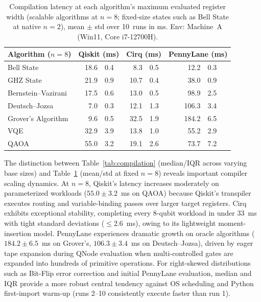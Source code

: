 \documentclass[runningheads]{llncs}
\begin{document}
\begin{table}[htbp]
\centering
\caption{Compilation latency at each algorithm's maximum evaluated register width (scalable algorithms at $n=8$; fixed-size states such as Bell State at native $n=2$), mean $\pm$ std over 10~runs in ms. Env: Machine~A (Win11, Core i7-12700H).}
\label{tab:compilation_8q}
\renewcommand{\arraystretch}{1.15}
\setlength{\tabcolsep}{6pt}
\begin{tabular}{@{}l r@{$\,\pm\,$}l r@{$\,\pm\,$}l r@{$\,\pm\,$}l@{}}
\toprule
\textbf{Algorithm ($n=8$)} & \multicolumn{2}{c}{\textbf{Qiskit (ms)}} & \multicolumn{2}{c}{\textbf{Cirq (ms)}} & \multicolumn{2}{c}{\textbf{PennyLane (ms)}} \\
\midrule
Bell State           & 18.6 & 0.4 &  8.3 & 0.5 &  12.2 & 0.3 \\
GHZ State            & 21.9 & 0.9 & 10.7 & 0.4 &  38.0 & 0.9 \\
Bernstein--Vazirani  & 17.5 & 0.6 & 13.0 & 0.5 &  98.9 & 2.5 \\
Deutsch--Jozsa       &  7.0 & 0.3 & 12.1 & 1.3 & 106.3 & 3.4 \\
Grover's Algorithm   &  9.6 & 0.5 & 32.5 & 1.9 & 184.2 & 6.5 \\
VQE                  & 32.9 & 3.9 & 13.8 & 1.0 &  55.2 & 2.9 \\
QAOA                 & 55.0 & 3.2 & 19.1 & 2.6 &  73.7 & 7.2 \\
\bottomrule
\end{tabular}
\end{table}

The distinction between Table~\ref{tab:compilation} (median/IQR across varying base sizes) and Table~\ref{tab:compilation_8q} (mean/std at fixed $n=8$) reveals important compiler scaling dynamics. At $n=8$, Qiskit's latency increases moderately on parameterized workloads ($55.0 \pm 3.2$~ms on QAOA) because Qiskit's transpiler executes routing and variable-binding passes over larger target registers. Cirq exhibits exceptional stability, completing every 8-qubit workload in under $33$~ms with tight standard deviations ($\le 2.6$~ms), owing to its lightweight moment-insertion model. PennyLane experiences dramatic growth on oracle algorithms ($184.2 \pm 6.5$~ms on Grover's, $106.3 \pm 3.4$~ms on Deutsch--Jozsa), driven by eager tape expansion during QNode evaluation when multi-controlled gates are expanded into hundreds of primitive operations. For right-skewed distributions such as Bit-Flip error correction and initial PennyLane evaluation, median and IQR provide a more robust central tendency against OS scheduling and Python first-import warm-up (runs 2--10 consistently execute faster than run 1).
\end{document}
